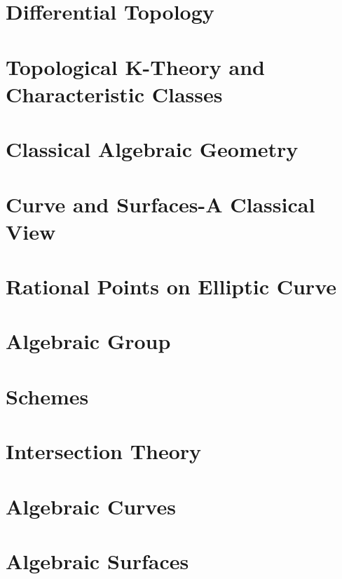 \documentclass{ModulEN}
\begin{document}
	
	\part{Differential Topology}
	
	\part{Topological K-Theory and Characteristic Classes}
		
	
	\part{Classical Algebraic Geometry}
	
		
		
	\part{Curve and Surfaces-A Classical View}
	
	\part{Rational Points on Elliptic Curve}
	
	\part{Algebraic Group}
	
	\part{Schemes}
	
	\part{Intersection Theory}
	
	\part{Algebraic Curves}
	
		
	
	\part{Algebraic Surfaces}
	
		
	
\end{document}
